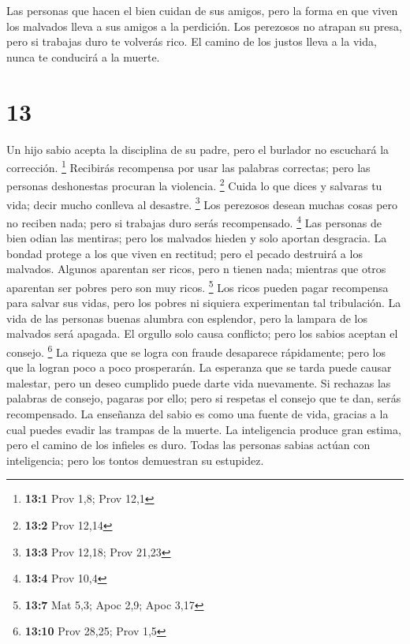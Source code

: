  Las personas que hacen el bien cuidan de sus amigos, pero
la forma en que viven los malvados lleva a sus amigos a la perdición.
 Los perezosos no atrapan su presa, pero si trabajas duro
te volverás rico.  El camino de los justos lleva a la vida,
nunca te conducirá a la muerte.

\hypertarget{section-12}{%
\section{13}\label{section-12}}

 Un hijo sabio acepta la disciplina de su padre, pero el
burlador no escuchará la corrección. \footnote{\textbf{13:1} Prov 1,8;
  Prov 12,1}  Recibirás recompensa por usar las palabras
correctas; pero las personas deshonestas procuran la violencia.
\footnote{\textbf{13:2} Prov 12,14}  Cuida lo que dices y
salvaras tu vida; decir mucho conlleva al desastre. \footnote{\textbf{13:3}
  Prov 12,18; Prov 21,23}  Los perezosos desean muchas cosas
pero no reciben nada; pero si trabajas duro serás recompensado.
\footnote{\textbf{13:4} Prov 10,4}  Las personas de bien
odian las mentiras; pero los malvados hieden y solo aportan desgracia.
 La bondad protege a los que viven en rectitud; pero el
pecado destruirá a los malvados.  Algunos aparentan ser
ricos, pero n tienen nada; mientras que otros aparentan ser pobres pero
son muy ricos. \footnote{\textbf{13:7} Mat 5,3; Apoc 2,9; Apoc 3,17}
 Los ricos pueden pagar recompensa para salvar sus vidas,
pero los pobres ni siquiera experimentan tal tribulación. 
La vida de las personas buenas alumbra con esplendor, pero la lampara de
los malvados será apagada.  El orgullo solo causa
conflicto; pero los sabios aceptan el consejo. \footnote{\textbf{13:10}
  Prov 28,25; Prov 1,5}  La riqueza que se logra con fraude
desaparece rápidamente; pero los que la logran poco a poco prosperarán.
 La esperanza que se tarda puede causar malestar, pero un
deseo cumplido puede darte vida nuevamente.  Si rechazas
las palabras de consejo, pagaras por ello; pero si respetas el consejo
que te dan, serás recompensado.  La enseñanza del sabio es
como una fuente de vida, gracias a la cual puedes evadir las trampas de
la muerte.  La inteligencia produce gran estima, pero el
camino de los infieles es duro.  Todas las personas sabias
actúan con inteligencia; pero los tontos demuestran su estupidez.
